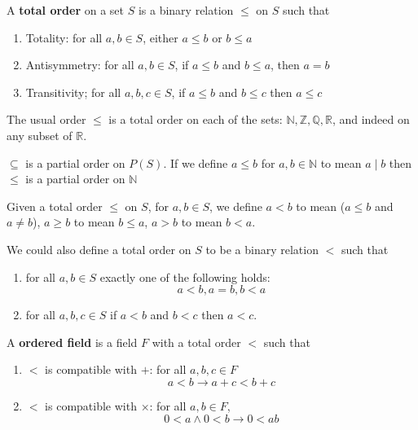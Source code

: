 
\begin{defn}
A \textbf{total order} on a set $S$ is a binary relation $\leq$ on $S$ such that 
\begin{enumerate}
\item Totality: for all $a,b\in S$, either $a\leq b$ or $b\leq a$
\item Antisymmetry: for all $a,b\in S$, if $a\leq b$ and $b\leq a$, then $a=b$
\item Transitivity; for all $a,b,c\in S$, if $a\leq b$ and $b\leq c$ then $a\leq c$
\end{enumerate}
\end{defn}

\begin{exmp}
The usual order $\leq$ is a total order on each of the sets: $\mathbb{N},\mathbb{Z},\mathbb{Q},\mathbb{R}$, and indeed on any subset of $\mathbb{R}$.

$\subseteq$ is a partial order on $P(S)$. If we define $a\leq b$ for $a,b\in\mathbb{N}$ to mean $a\mid b$ then $\leq$ is a partial order on $\mathbb{N}$
\end{exmp}

\begin{defn}
Given a total order $\leq$ on $S$, for $a,b\in S$, we define $a<b$ to mean ($a\leq b$ and $a\neq b$), $a\geq b$ to mean $b\leq a$, $a>b$ to mean $b<a$.
\end{defn}

\begin{rem}
We could also define a total order on $S$ to be a binary relation $<$ such that 
\begin{enumerate}
\item for all $a,b\in S$ exactly one of the following holds: \[a<b, a=b, b<a\]
\item for all $a,b,c\in S$ if $a<b$ and $b<c$ then $a<c$.
\end{enumerate}
\end{rem}

\begin{defn}
A \textbf{ordered field} is a field $F$ with a total order $<$ such that
\begin{enumerate}
\item $<$ is compatible with $+$: for all $a,b,c\in F$ \[a<b \to a+c < b+c\]
\item $<$ is compatible with $\times$: for all $a,b\in F$, \[0<a\wedge 0<b \to 0<ab\]
\end{enumerate}
\end{defn}

